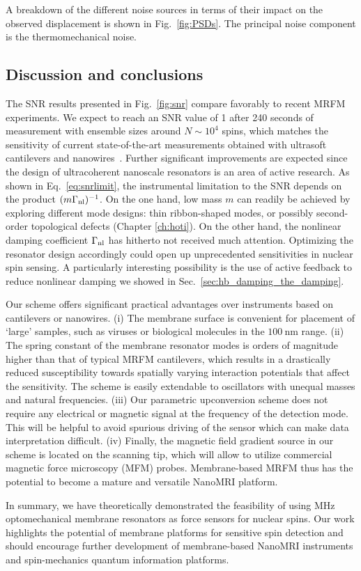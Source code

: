 A breakdown of the different noise sources in terms of their impact on the observed displacement is shown in Fig.~\ref{fig:PSDs}. The principal noise component is the thermomechanical noise.

\subsection{Discussion and conclusions} \label{subsec:spins_disc}
The SNR results presented in Fig.~\ref{fig:snr} compare favorably to recent MRFM experiments. We expect to reach an SNR value of 1 after 240 seconds of measurement with ensemble sizes around $N \sim 10^4$ spins, which matches the sensitivity of current state-of-the-art measurements obtained with ultrasoft cantilevers and nanowires~\cite{Moores_2015, Rose_2018, Grob_2019}. Further significant improvements are expected since the design of ultracoherent nanoscale resonators is an area of active research. As shown in Eq.~\eqref{eq:snrlimit}, the instrumental limitation to the SNR depends on the product $(m \Gamma_{\rm nl})^{-1}$. On the one hand, low mass $m$ can readily be achieved by exploring different mode designs: thin ribbon-shaped modes, or possibly second-order topological defects (Chapter \ref{ch:hoti}). On the other hand, the nonlinear damping coefficient $\Gamma_{\rm nl}$ has hitherto not received much attention. Optimizing the resonator design accordingly could open up unprecedented sensitivities in nuclear spin sensing. A particularly interesting possibility is the use of active feedback to reduce nonlinear damping we showed in Sec.~\ref{sec:hb_damping_the_damping}.

Our scheme offers significant practical advantages over instruments based on cantilevers or nanowires. (i) The membrane surface is convenient for placement of `large' samples, such as viruses or biological molecules in the $100~$nm range. (ii) The spring constant of the membrane resonator modes is orders of magnitude higher than that of typical MRFM cantilevers, which results in a drastically reduced susceptibility towards spatially varying interaction potentials that affect the sensitivity. The scheme is easily extendable to oscillators with unequal masses and natural frequencies. (iii) Our parametric upconversion scheme does not require any electrical or magnetic signal at the frequency of the detection mode. This will be helpful to avoid spurious driving of the sensor which can make data interpretation difficult. (iv) Finally, the magnetic field gradient source in our scheme is located on the scanning tip, which will allow to utilize commercial magnetic force microscopy (MFM) probes. Membrane-based MRFM thus has the potential to become a mature and versatile NanoMRI platform.

In summary, we have theoretically demonstrated the feasibility of using MHz optomechanical membrane resonators as force sensors for nuclear spins. Our work highlights the potential of membrane platforms for sensitive spin detection and should encourage further development of membrane-based NanoMRI instruments and spin-mechanics quantum information platforms.